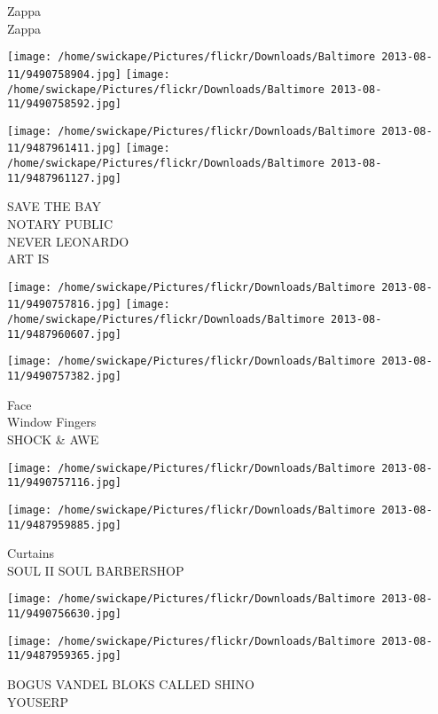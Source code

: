 \documentclass[10pt,letterpaper]{article}
\begin{document}
Zappa\\
Zappa\\
\pagebreak

\texttt{[image: /home/swickape/Pictures/flickr/Downloads/Baltimore 2013-08-11/9490758904.jpg]}
\texttt{[image: /home/swickape/Pictures/flickr/Downloads/Baltimore 2013-08-11/9490758592.jpg]}

\texttt{[image: /home/swickape/Pictures/flickr/Downloads/Baltimore 2013-08-11/9487961411.jpg]}
\texttt{[image: /home/swickape/Pictures/flickr/Downloads/Baltimore 2013-08-11/9487961127.jpg]}

SAVE THE BAY\\
NOTARY PUBLIC\\
NEVER LEONARDO\\
ART IS\\
\pagebreak

\texttt{[image: /home/swickape/Pictures/flickr/Downloads/Baltimore 2013-08-11/9490757816.jpg]}
\texttt{[image: /home/swickape/Pictures/flickr/Downloads/Baltimore 2013-08-11/9487960607.jpg]}

\texttt{[image: /home/swickape/Pictures/flickr/Downloads/Baltimore 2013-08-11/9490757382.jpg]}

Face\\
Window Fingers\\
SHOCK \& AWE\\
\pagebreak

\texttt{[image: /home/swickape/Pictures/flickr/Downloads/Baltimore 2013-08-11/9490757116.jpg]}

\vspace{0.25in}
\texttt{[image: /home/swickape/Pictures/flickr/Downloads/Baltimore 2013-08-11/9487959885.jpg]}

Curtains\\
SOUL II SOUL BARBERSHOP\\
\pagebreak

\texttt{[image: /home/swickape/Pictures/flickr/Downloads/Baltimore 2013-08-11/9490756630.jpg]}

\vspace{0.25in}
\texttt{[image: /home/swickape/Pictures/flickr/Downloads/Baltimore 2013-08-11/9487959365.jpg]}

BOGUS VANDEL BLOKS CALLED SHINO\\
YOUSERP\\
\pagebreak
\end{document}
